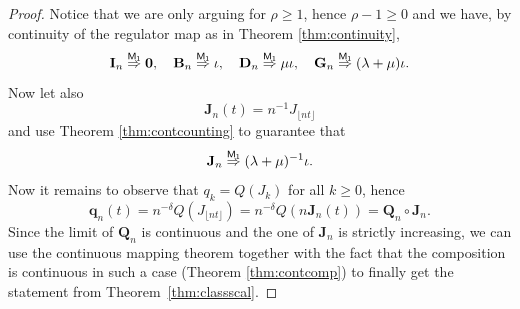 \documentclass[10pt,a4paper]{amsart}
\begin{document}
\begin{proof}
	Notice that we are only arguing for $\rho \ge 1$, hence $\rho-1 \ge 0$ and we have, by continuity of the regulator map as in Theorem \ref{thm:continuity},
	\begin{equation*}
		\mathbf{I}_n \overset{\sf M_1}{\Rightarrow} \mathbf{0}, \quad \mathbf{B}_n \overset{\sf M_1}{\Rightarrow} \iota, \quad \mathbf{D}_n \overset{\sf M_1}{\Rightarrow} \mu\iota, \quad 
		\mathbf{G}_n \overset{\sf M_1}{\Rightarrow} (\lambda+\mu) \iota.
	\end{equation*}
	Now let also
	\begin{equation*}
		\mathbf{J}_n(t)=n^{-1}J_{\lfloor nt \rfloor}
	\end{equation*}
	and use Theorem \ref{thm:contcounting} to guarantee that
	\begin{equation*}
		\mathbf{J}_n \overset{\sf M_1}{\Rightarrow} (\lambda+\mu)^{-1}\iota.
	\end{equation*}
	Now it remains to observe that $q_k=Q(J_k)$ for all $k \ge 0$, hence
	\begin{equation*}
		\mathbf{q}_n(t)=n^{-\delta}Q(J_{\lfloor nt \rfloor})=n^{-\delta}Q(n\mathbf{J}_n(t))=\mathbf{Q}_n \circ \mathbf{J}_n.
	\end{equation*}
	Since the limit of $\mathbf{Q}_n$ is continuous and the one of $\mathbf{J}_n$ is strictly increasing, we can use the continuous mapping theorem together with the fact that the composition is continuous in such a case (Theorem \ref{thm:contcomp}) to finally get the statement from Theorem~\ref{thm:classscal}.
\end{proof}
\end{document}
